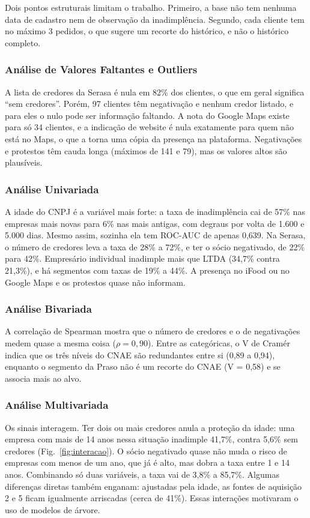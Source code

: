 \documentclass[conference]{IEEEtran}
\begin{document}
Dois pontos estruturais limitam o trabalho. Primeiro, a base não tem nenhuma data de cadastro nem de observação da inadimplência. Segundo, cada cliente tem no máximo 3 pedidos, o que sugere um recorte do histórico, e não o histórico completo.

\subsubsection{Análise de Valores Faltantes e Outliers}
A lista de credores da Serasa é nula em 82\% dos clientes, o que em geral significa ``sem credores''. Porém, 97 clientes têm negativação e nenhum credor listado, e para eles o nulo pode ser informação faltando. A nota do Google Maps existe para só 34 clientes, e a indicação de website é nula exatamente para quem não está no Maps, o que a torna uma cópia da presença na plataforma. Negativações e protestos têm cauda longa (máximos de 141 e 79), mas os valores altos são plausíveis.

\subsubsection{Análise Univariada}
A idade do CNPJ é a variável mais forte: a taxa de inadimplência cai de 57\% nas empresas mais novas para 6\% nas mais antigas, com degraus por volta de 1.600 e 5.000 dias. Mesmo assim, sozinha ela tem ROC-AUC de apenas 0,639. Na Serasa, o número de credores leva a taxa de 28\% a 72\%, e ter o sócio negativado, de 22\% para 42\%. Empresário individual inadimple mais que LTDA (34,7\% contra 21,3\%), e há segmentos com taxas de 19\% a 44\%. A presença no iFood ou no Google Maps e os protestos quase não informam.

\subsubsection{Análise Bivariada}
A correlação de Spearman mostra que o número de credores e o de negativações medem quase a mesma coisa ($\rho = 0{,}90$). Entre as categóricas, o V de Cramér indica que os três níveis do CNAE são redundantes entre si (0,89 a 0,94), enquanto o segmento da Praso não é um recorte do CNAE (V = 0,58) e se associa mais ao alvo.

\subsubsection{Análise Multivariada}
Os sinais interagem. Ter dois ou mais credores anula a proteção da idade: uma empresa com mais de 14 anos nessa situação inadimple 41,7\%, contra 5,6\% sem credores (Fig.~\ref{fig:interacao}). O sócio negativado quase não muda o risco de empresas com menos de um ano, que já é alto, mas dobra a taxa entre 1 e 14 anos. Combinando só duas variáveis, a taxa vai de 3,8\% a 85,7\%. Algumas diferenças diretas também enganam: ajustadas pela idade, as fontes de aquisição 2 e 5 ficam igualmente arriscadas (cerca de 41\%). Essas interações motivaram o uso de modelos de árvore.
\end{document}
